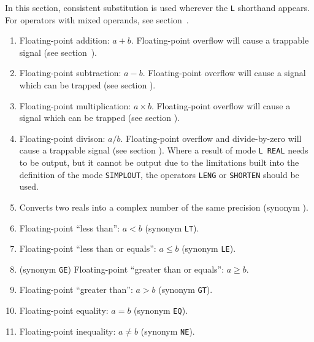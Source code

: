 In this section, consistent substitution is used wherever the \verb|L|
shorthand appears. For operators with mixed operands, see
section~.
\begin{enumerate}
\item {} \newline
Floating-point addition: $a+b$. Floating-point overflow will cause a
trappable signal (see section~).
\item {} \newline
Floating-point subtraction: $a-b$. Floating-point overflow will cause a
signal which can be trapped (see section ).
\item {} \newline
Floating-point multiplication: $a\times b$. Floating-point overflow
will cause a signal which can be trapped (see section ).
\item {} \newline
Floating-point divison: $a/b$. Floating-point overflow and
divide-by-zero will cause a trappable signal (see
section ). Where a result of mode \verb|L REAL| needs to
be output, but it cannot be output due to the limitations built into
the definition of the mode \verb|SIMPLOUT|, the operators \verb|LENG|
or \verb|SHORTEN| should be used.
\item {}\newline
Converts two reals into a complex number of the same precision
(synonym ).
\item {}\newline
Floating-point ``less than'': $a<b$ (synonym \verb|LT|).
\item {}\newline
Floating-point ``less than or equals'': $a\leq b$ (synonym \verb|LE|).
\item {}
\newline(synonym \verb|GE|)\newline
Floating-point ``greater than or equals'': $a\geq b$.
\item {}\newline
Floating-point ``greater than'': $a>b$ (synonym \verb|GT|).
\item {}\newline
Floating-point equality: $a=b$ (synonym \verb|EQ|).
\item {}\newline
Floating-point inequality: $a\neq b$ (synonym \verb|NE|).
\end{enumerate}

